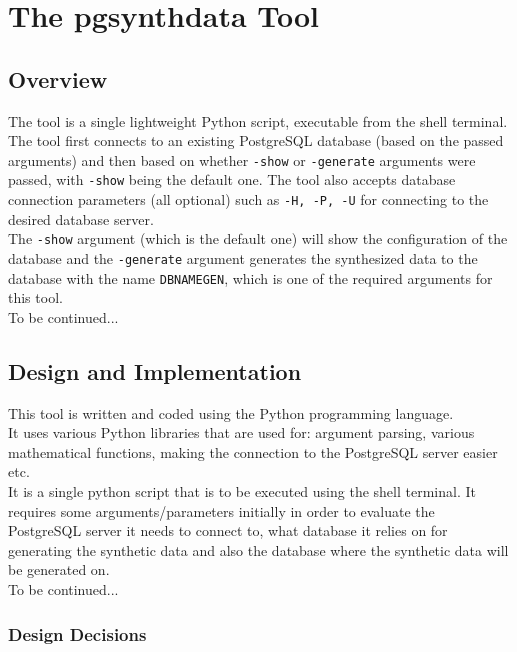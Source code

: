 \chapter{The pgsynthdata Tool}
\label{ch:pgsynthdata_tool}
\section{Overview}
The tool is a single lightweight Python script, executable from the shell terminal. The tool first connects to an existing PostgreSQL database (based on the passed arguments) and then based on whether \texttt{-show} or \texttt{-generate} arguments were passed, with \texttt{-show} being the default one. The tool also accepts database connection parameters (all optional) such as \texttt{-H, -P, -U} for connecting to the desired database server.\\
The \texttt{-show} argument (which is the default one) will show the configuration of the database and the \texttt{-generate} argument generates the synthesized data to the database with the name \texttt{DBNAMEGEN}, which is one of the required arguments for this tool.\\
To be continued...
\section{Design and Implementation}
This tool is written and coded using the Python programming language.\\
It uses various Python libraries that are used for: argument parsing, various mathematical functions, making the connection to the PostgreSQL server easier etc.\\
It is a single python script that is to be executed using the shell terminal. It requires some arguments/parameters initially in order to evaluate the PostgreSQL server it needs to connect to, what database it relies on for generating the synthetic data and also the database where the synthetic data will be generated on.\\
To be continued...
\subsection{Design Decisions}
\lipsum[2-3]
